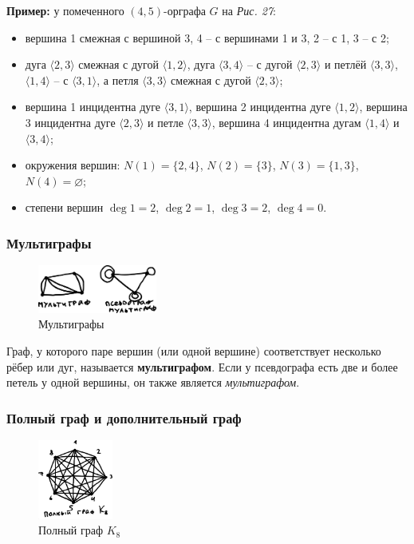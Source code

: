 \documentclass[12pt, a4paper]{article}
\newcommand{\irv}[1]{\langle #1 \rangle}
\begin{document}
\textbf{Пример:} у помеченного $(4,5)$-орграфа $G$ на \textit{Рис. 27}:
\begin{itemize}
 \item вершина 1 смежная с вершиной 3, 4 -- с вершинами 1 и 3, 2 -- с 1, 3 -- с 2;
 \item дуга $\irv{2,3}$ смежная с дугой $\irv{1,2}$, дуга $\irv{3,4}$ -- с дугой $\irv{2,3}$ и петлёй $\irv{3,3}$, $\irv{1,4}$ -- с $\irv{3,1}$, а петля $\irv{3,3}$ смежная с дугой $\irv{2,3}$;
 \item вершина 1 инцидентна дуге $\irv{3,1}$, вершина 2 инцидентна дуге $\irv{1,2}$, вершина 3 инцидентна дуге $\irv{2,3}$ и петле $\irv{3,3}$, вершина 4 инцидентна дугам $\irv{1,4}$ и $\irv{3,4}$;
 \item окружения вершин: $N(1) = \{ 2,4 \}$, $N(2) = \{ 3 \}$, $N(3) = \{ 1,3 \}$, $N(4) = \varnothing$;
 \item степени вершин $\deg 1=2$, $\deg2=1$, $\deg3=2$, $\deg4=0$.
\end{itemize}

\subsubsection{Мультиграфы}

\begin{figure}[h]
 \centering
 \includegraphics[width=0.35\textwidth]{29}
 \vspace{-3mm}
  \caption{Мультиграфы}
\end{figure}

Граф, у которого паре вершин (или одной вершине) соответствует несколько рёбер или дуг, называется \textbf{мультиграфом}. Если у псевдографа есть две и более петель у одной вершины, он также является \textit{мультиграфом}.

\subsubsection{Полный граф и дополнительный граф}

\begin{figure}
  \centering
  \includegraphics[width=0.22\textwidth]{30}
  \vspace{-7mm}
  \caption{Полный граф $K_8$}
\end{figure}
\end{document}
